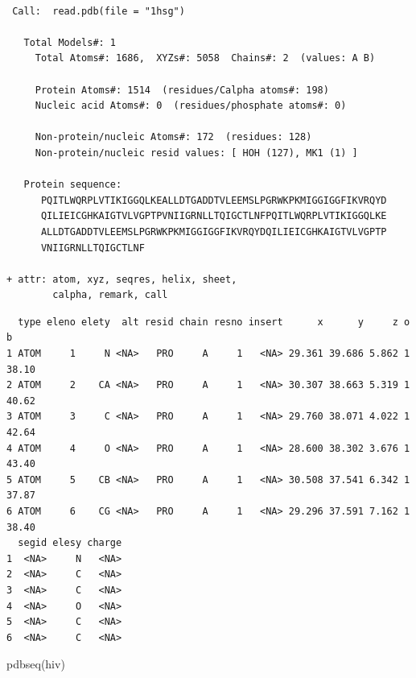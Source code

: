 \documentclass[
  letterpaper,
  DIV=11,
  numbers=noendperiod]{scrartcl}
\newenvironment{Shaded}{\begin{snugshade}}{\end{snugshade}}
\newcommand{\FunctionTok}[1]{\textcolor[rgb]{0.28,0.35,0.67}{#1}}
\newcommand{\NormalTok}[1]{\textcolor[rgb]{0.00,0.23,0.31}{#1}}
\newcommand{\SpecialCharTok}[1]{\textcolor[rgb]{0.37,0.37,0.37}{#1}}
\begin{document}
\begin{verbatim}

 Call:  read.pdb(file = "1hsg")

   Total Models#: 1
     Total Atoms#: 1686,  XYZs#: 5058  Chains#: 2  (values: A B)

     Protein Atoms#: 1514  (residues/Calpha atoms#: 198)
     Nucleic acid Atoms#: 0  (residues/phosphate atoms#: 0)

     Non-protein/nucleic Atoms#: 172  (residues: 128)
     Non-protein/nucleic resid values: [ HOH (127), MK1 (1) ]

   Protein sequence:
      PQITLWQRPLVTIKIGGQLKEALLDTGADDTVLEEMSLPGRWKPKMIGGIGGFIKVRQYD
      QILIEICGHKAIGTVLVGPTPVNIIGRNLLTQIGCTLNFPQITLWQRPLVTIKIGGQLKE
      ALLDTGADDTVLEEMSLPGRWKPKMIGGIGGFIKVRQYDQILIEICGHKAIGTVLVGPTP
      VNIIGRNLLTQIGCTLNF

+ attr: atom, xyz, seqres, helix, sheet,
        calpha, remark, call
\end{verbatim}

\begin{Shaded}
\end{Shaded}

\begin{verbatim}
  type eleno elety  alt resid chain resno insert      x      y     z o     b
1 ATOM     1     N <NA>   PRO     A     1   <NA> 29.361 39.686 5.862 1 38.10
2 ATOM     2    CA <NA>   PRO     A     1   <NA> 30.307 38.663 5.319 1 40.62
3 ATOM     3     C <NA>   PRO     A     1   <NA> 29.760 38.071 4.022 1 42.64
4 ATOM     4     O <NA>   PRO     A     1   <NA> 28.600 38.302 3.676 1 43.40
5 ATOM     5    CB <NA>   PRO     A     1   <NA> 30.508 37.541 6.342 1 37.87
6 ATOM     6    CG <NA>   PRO     A     1   <NA> 29.296 37.591 7.162 1 38.40
  segid elesy charge
1  <NA>     N   <NA>
2  <NA>     C   <NA>
3  <NA>     C   <NA>
4  <NA>     O   <NA>
5  <NA>     C   <NA>
6  <NA>     C   <NA>
\end{verbatim}

\begin{Shaded}
\begin{Highlighting}[]
\FunctionTok{pdbseq}\NormalTok{(hiv)}
\end{Highlighting}
\end{Shaded}
\end{document}
